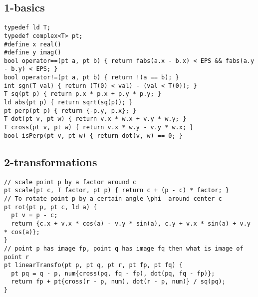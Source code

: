 \documentclass[twoside]{article}
\begin{document}
\begin{multicols*}{2}
{\subsection*{1-basics}
}
\begin{verbatim}
typedef ld T;
typedef complex<T> pt;
#define x real()
#define y imag()
bool operator==(pt a, pt b) { return fabs(a.x - b.x) < EPS && fabs(a.y - b.y) < EPS; }
bool operator!=(pt a, pt b) { return !(a == b); }
int sgn(T val) { return (T(0) < val) - (val < T(0)); }
T sq(pt p) { return p.x * p.x + p.y * p.y; }
ld abs(pt p) { return sqrt(sq(p)); }
pt perp(pt p) { return {-p.y, p.x}; }
T dot(pt v, pt w) { return v.x * w.x + v.y * w.y; }
T cross(pt v, pt w) { return v.x * w.y - v.y * w.x; }
bool isPerp(pt v, pt w) { return dot(v, w) == 0; }
\end{verbatim}

{
\subsection*{2-transformations}
}
\begin{verbatim}
// scale point p by a factor around c
pt scale(pt c, T factor, pt p) { return c + (p - c) * factor; }
// To rotate point p by a certain angle \phi  around center c
pt rot(pt p, pt c, ld a) {
  pt v = p - c;
  return {c.x + v.x * cos(a) - v.y * sin(a), c.y + v.x * sin(a) + v.y * cos(a)};
}
// point p has image fp, point q has image fq then what is image of point r
pt linearTransfo(pt p, pt q, pt r, pt fp, pt fq) {
  pt pq = q - p, num{cross(pq, fq - fp), dot(pq, fq - fp)};
  return fp + pt{cross(r - p, num), dot(r - p, num)} / sq(pq);
}

\end{verbatim}

{
}
\end{multicols*}
\end{document}
